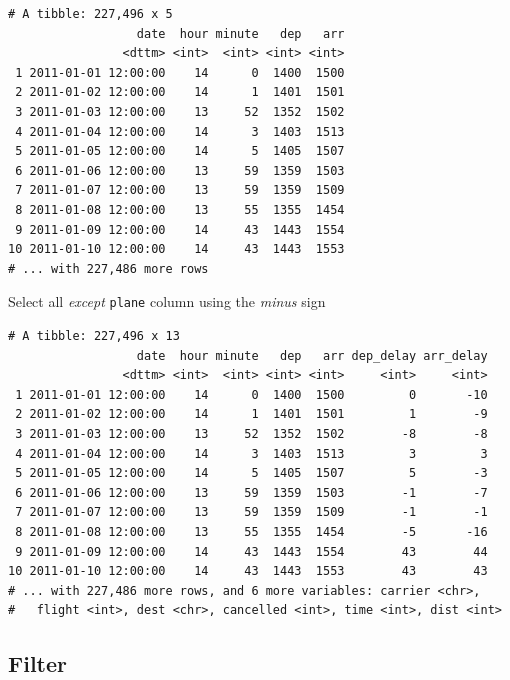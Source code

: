 \documentclass[]{article}
\newenvironment{Shaded}{\begin{snugshade}}{\end{snugshade}}
\newcommand{\KeywordTok}[1]{\textcolor[rgb]{0.13,0.29,0.53}{\textbf{{#1}}}}
\newcommand{\StringTok}[1]{\textcolor[rgb]{0.31,0.60,0.02}{{#1}}}
\newcommand{\NormalTok}[1]{{#1}}
\theoremstyle{definition}
\theoremstyle{definition}
\theoremstyle{definition}
\theoremstyle{remark}
\begin{document}
\begin{verbatim}
# A tibble: 227,496 x 5
                  date  hour minute   dep   arr
                <dttm> <int>  <int> <int> <int>
 1 2011-01-01 12:00:00    14      0  1400  1500
 2 2011-01-02 12:00:00    14      1  1401  1501
 3 2011-01-03 12:00:00    13     52  1352  1502
 4 2011-01-04 12:00:00    14      3  1403  1513
 5 2011-01-05 12:00:00    14      5  1405  1507
 6 2011-01-06 12:00:00    13     59  1359  1503
 7 2011-01-07 12:00:00    13     59  1359  1509
 8 2011-01-08 12:00:00    13     55  1355  1454
 9 2011-01-09 12:00:00    14     43  1443  1554
10 2011-01-10 12:00:00    14     43  1443  1553
# ... with 227,486 more rows
\end{verbatim}

Select all \emph{except} \texttt{plane} column using the \emph{minus}
sign

\begin{Shaded}
\end{Shaded}

\begin{verbatim}
# A tibble: 227,496 x 13
                  date  hour minute   dep   arr dep_delay arr_delay
                <dttm> <int>  <int> <int> <int>     <int>     <int>
 1 2011-01-01 12:00:00    14      0  1400  1500         0       -10
 2 2011-01-02 12:00:00    14      1  1401  1501         1        -9
 3 2011-01-03 12:00:00    13     52  1352  1502        -8        -8
 4 2011-01-04 12:00:00    14      3  1403  1513         3         3
 5 2011-01-05 12:00:00    14      5  1405  1507         5        -3
 6 2011-01-06 12:00:00    13     59  1359  1503        -1        -7
 7 2011-01-07 12:00:00    13     59  1359  1509        -1        -1
 8 2011-01-08 12:00:00    13     55  1355  1454        -5       -16
 9 2011-01-09 12:00:00    14     43  1443  1554        43        44
10 2011-01-10 12:00:00    14     43  1443  1553        43        43
# ... with 227,486 more rows, and 6 more variables: carrier <chr>,
#   flight <int>, dest <chr>, cancelled <int>, time <int>, dist <int>
\end{verbatim}

\subsection{Filter}\label{filter}
\end{document}
